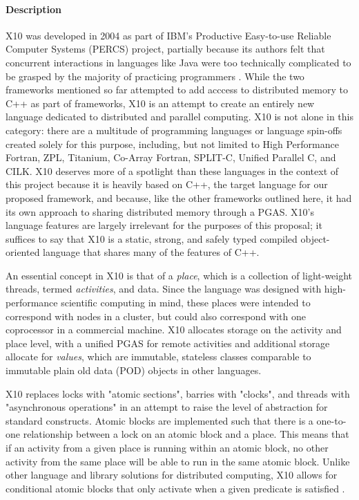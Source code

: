 {	\paragraph{Description} \label{X10_desc}
X10 was developed in 2004 as part of IBM's Productive Easy-to-use Reliable Computer Systems (PERCS) project, partially because its authors felt that concurrent interactions in languages like Java were too technically complicated to be grasped by the majority of practicing programmers \cite{X10}. While the two frameworks mentioned so far attempted to add acccess to distributed memory to C++ as part of frameworks, X10 is an attempt to create an entirely new language dedicated to distributed and parallel computing. X10 is not alone in this category: there are a multitude of programming languages or language spin-offs created solely for this purpose, including, but not limited to High Performance Fortran, ZPL, Titanium, Co-Array Fortran, SPLIT-C, Unified Parallel C, and CILK. X10 deserves more of a spotlight than these languages in the context of this project because it is heavily based on C++, the target language for our proposed framework, and because, like the other frameworks outlined here, it had its own approach to sharing distributed memory through a PGAS. X10's language features are largely irrelevant for the purposes of this proposal; it suffices to say that X10 is a static, strong, and safely typed compiled object-oriented language that shares many of the features of C++. 

An essential concept in X10 is that of a \textit{place}, which is a collection of light-weight threads, termed \textit{activities}, and data. Since the language was designed with high-performance scientific computing in mind, these places were intended to correspond with nodes in a cluster, but could also correspond with one coprocessor in a commercial machine. X10 allocates storage on the activity and place level, with a unified PGAS for remote activities and additional storage allocate for \textit{values}, which are immutable, stateless classes comparable to immutable plain old data (POD) objects in other languages. 

X10 replaces locks with "atomic sections", barries with "clocks", and threads with "asynchronous operations" in an attempt to raise the level of abstraction for standard constructs. Atomic blocks are implemented such that there is a one-to-one relationship between a lock on an atomic block and a place. This means that if an activity from a given place is running within an atomic block, no other activity from the same place will be able to run in the same atomic block. Unlike other language and library solutions for distributed computing, X10 allows for conditional atomic blocks that only activate when a given predicate is satisfied \cite{X10_2005}. 

}
